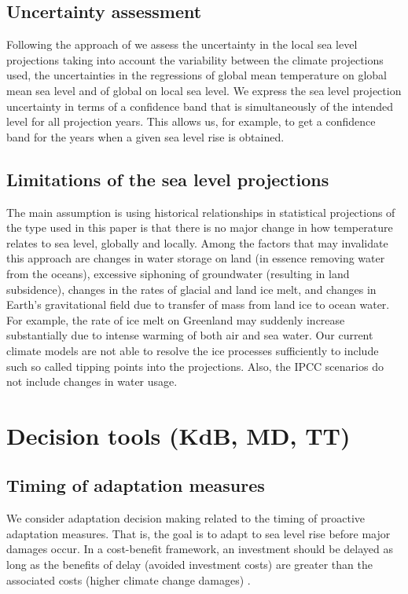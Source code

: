 \documentclass[draft,linenumbers]{agujournal}
\begin{document}
\subsection{Uncertainty assessment}
\label{unc_ass}
Following the approach of \citet{Guttorp2014} we assess the uncertainty in the local sea level projections taking into account the variability between the climate projections used, the uncertainties in the regressions of global mean temperature on global mean sea level and of global on local sea level. We express the sea level projection uncertainty in terms of a confidence band that is simultaneously of the intended  level  for all projection years. This allows us, for example, to get a confidence band for the years when a given sea level rise is obtained. 



\subsection{Limitations of the sea level projections}
The main assumption is using historical relationships in statistical projections of the type used in this paper is that there is no major change in how temperature relates to sea level, globally and locally. Among the factors that may invalidate this approach are changes in water storage on land (in essence removing water from the oceans), excessive siphoning of groundwater (resulting in land subsidence), changes in the rates of glacial and land ice melt, and changes in Earth's gravitational field due to transfer of mass from land ice to ocean water. For example, the rate of ice melt on Greenland may suddenly increase substantially due to intense warming of both air and sea water. Our current climate models are not able to resolve the ice processes sufficiently to include such so called tipping points into the projections. Also, the IPCC scenarios \citep{change} do not include changes in water usage.

\section{Decision tools {\color{blue} (KdB, MD, TT)}}

\subsection{Timing of adaptation measures}

We consider adaptation decision making related to the timing of proactive adaptation measures. That is, the goal is to adapt to sea level rise before major damages occur. In a cost-benefit framework, an investment should be delayed as long as the benefits of delay (avoided investment costs) are greater than the associated costs (higher climate change damages) \citep{Fankhauser&1999}.
\end{document}
